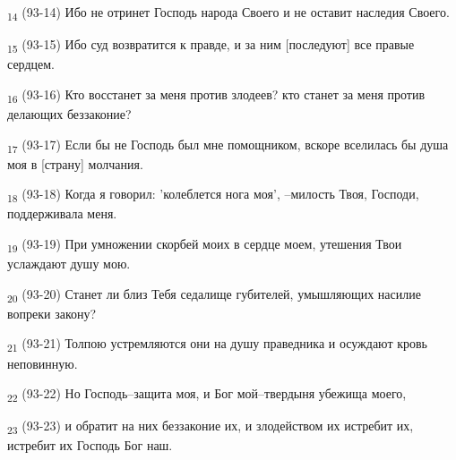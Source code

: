 \begin{tcolorbox}
\textsubscript{14} (93-14) Ибо не отринет Господь народа Своего и не оставит наследия Своего.
\end{tcolorbox}
\begin{tcolorbox}
\textsubscript{15} (93-15) Ибо суд возвратится к правде, и за ним [последуют] все правые сердцем.
\end{tcolorbox}
\begin{tcolorbox}
\textsubscript{16} (93-16) Кто восстанет за меня против злодеев? кто станет за меня против делающих беззаконие?
\end{tcolorbox}
\begin{tcolorbox}
\textsubscript{17} (93-17) Если бы не Господь был мне помощником, вскоре вселилась бы душа моя в [страну] молчания.
\end{tcolorbox}
\begin{tcolorbox}
\textsubscript{18} (93-18) Когда я говорил: 'колеблется нога моя', --милость Твоя, Господи, поддерживала меня.
\end{tcolorbox}
\begin{tcolorbox}
\textsubscript{19} (93-19) При умножении скорбей моих в сердце моем, утешения Твои услаждают душу мою.
\end{tcolorbox}
\begin{tcolorbox}
\textsubscript{20} (93-20) Станет ли близ Тебя седалище губителей, умышляющих насилие вопреки закону?
\end{tcolorbox}
\begin{tcolorbox}
\textsubscript{21} (93-21) Толпою устремляются они на душу праведника и осуждают кровь неповинную.
\end{tcolorbox}
\begin{tcolorbox}
\textsubscript{22} (93-22) Но Господь--защита моя, и Бог мой--твердыня убежища моего,
\end{tcolorbox}
\begin{tcolorbox}
\textsubscript{23} (93-23) и обратит на них беззаконие их, и злодейством их истребит их, истребит их Господь Бог наш.
\end{tcolorbox}
